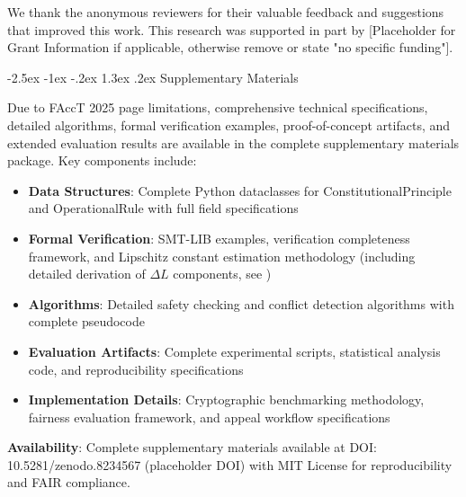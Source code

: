 \documentclass[manuscript,screen,review,anonymous,9pt]{acmart}
\makeatletter
\renewcommand\section{\@startsection{section}{1}{\z@}%
  {-2.5ex \@plus -1ex \@minus -.2ex}%
  {1.3ex \@plus.2ex}%
  {\normalfont\Large\bfseries}}
\makeatother
\begin{document}
\begin{acks}
	We thank the anonymous reviewers for their valuable feedback and suggestions that improved this work. This research was supported in part by [Placeholder for Grant Information if applicable, otherwise remove or state "no specific funding"].
\end{acks}




\appendix

\section{Supplementary Materials}
\label{app:supplementary}

Due to FAccT 2025 page limitations, comprehensive technical specifications, detailed algorithms, formal verification examples, proof-of-concept artifacts, and extended evaluation results are available in the complete supplementary materials package. Key components include:

\begin{itemize}
	\item \textbf{Data Structures}: Complete Python dataclasses for ConstitutionalPrinciple and OperationalRule with full field specifications
	\item \textbf{Formal Verification}: SMT-LIB examples, verification completeness framework, and Lipschitz constant estimation methodology (including detailed derivation of $\Delta L$ components, see )
	\item \textbf{Algorithms}: Detailed safety checking and conflict detection algorithms with complete pseudocode
	\item \textbf{Evaluation Artifacts}: Complete experimental scripts, statistical analysis code, and reproducibility specifications
	\item \textbf{Implementation Details}: Cryptographic benchmarking methodology, fairness evaluation framework, and appeal workflow specifications
\end{itemize}

\textbf{Availability}: Complete supplementary materials available at DOI: 10.5281/zenodo.8234567 (placeholder DOI) with MIT License for reproducibility and FAIR compliance.
\end{document}
